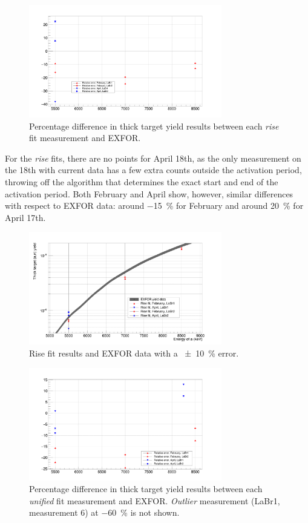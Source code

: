 \documentclass[a4paper,12pt]{report}
\begin{document}
\begin{figure}[H]
	\centering
	\includegraphics[width=0.75\textwidth]{rise_errors_per.png}
	\caption{Percentage difference in thick target yield results between each \textit{rise} fit measurement and EXFOR.}
	\label{rise_errors_per}
\end{figure}

For the \textit{rise} fits, there are no points for April 18th, as the only measurement on the 18th with current data has a few extra counts outside the activation period, throwing off the algorithm that determines the exact start and end of the activation period.
Both February and April show, however, similar differences with respect to EXFOR data: around \qty{-15}{\percent} for February and around \qty{+20}{\percent} for April 17th.

\begin{figure}[H]
	\centering
	\includegraphics[width=0.75\textwidth]{reactions_v_energy_rise.png}
	\caption{Rise fit results and EXFOR data with a \qty{\pm 10}{\percent} error.}
	\label{reactions_v_energy_rise}
\end{figure}

\begin{figure}[H]
	\centering
	\includegraphics[width=0.75\textwidth]{unified_errors_per.png}
	\caption{Percentage difference in thick target yield results between each \textit{unified} fit measurement and EXFOR.
	\textit{Outlier} measurement (LaBr1, measurement 6) at \qty{-60}{\percent} is not shown.}
	\label{unified_errors_per}
\end{figure}
\end{document}
